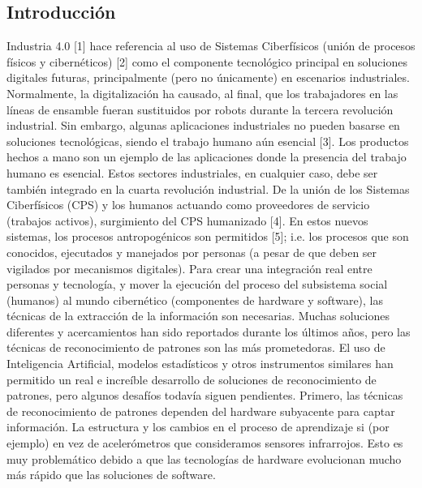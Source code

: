 \documentclass[a4paper]{article}
\begin{document}
\begin{}
\begin{}


\section{Introducción}
Industria 4.0 [1] hace referencia al uso de Sistemas Ciberfísicos (unión de procesos físicos y cibernéticos) [2] como el componente tecnológico principal en soluciones digitales futuras, principalmente (pero no únicamente) en escenarios industriales. Normalmente, la digitalización ha causado, al final, que los trabajadores en las líneas de ensamble fueran sustituidos por robots durante la tercera revolución industrial.
Sin embargo, algunas aplicaciones industriales no pueden basarse en soluciones tecnológicas, siendo el trabajo humano aún esencial [3]. Los productos hechos a mano son un ejemplo de las aplicaciones donde la presencia del trabajo humano es esencial. Estos sectores industriales, en cualquier caso, debe ser también integrado en la cuarta revolución industrial. De la unión de los Sistemas Ciberfísicos (CPS) y los humanos actuando como proveedores de servicio (trabajos activos), surgimiento del CPS humanizado [4]. En estos nuevos sistemas, los procesos antropogénicos son permitidos [5]; i.e. los procesos que son conocidos, ejecutados y manejados por personas (a pesar de que deben ser vigilados por mecanismos digitales).
Para crear una integración real entre personas y tecnología, y mover la ejecución del proceso del subsistema social (humanos) al mundo cibernético (componentes de hardware y software), las técnicas de la extracción de la información son necesarias. Muchas soluciones diferentes y acercamientos han sido reportados durante los últimos años, pero las técnicas de reconocimiento de patrones son las más prometedoras.
El uso de Inteligencia Artificial, modelos estadísticos y otros instrumentos similares han permitido un real e increíble desarrollo de soluciones de reconocimiento de patrones, pero algunos desafíos todavía siguen pendientes.
Primero, las técnicas de reconocimiento de patrones dependen del hardware subyacente para captar información. La estructura y los cambios en el proceso de aprendizaje si (por ejemplo) en vez de acelerómetros que  consideramos sensores infrarrojos. Esto es muy problemático debido a que las tecnologías de hardware evolucionan mucho más rápido que las soluciones de software.

\end{}
\end{}
\end{document}
